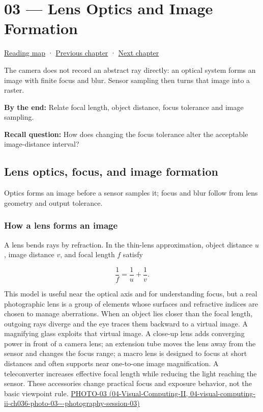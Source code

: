 \hypertarget{03-visual-computing-i-ch003}{}
\chapter{03 --- Lens Optics and Image Formation}\label{03-visual-computing-i-ch003-lens-optics-and-image-formation}

\hyperref[volume-reading-map]{Reading map} · \hyperref[03-visual-computing-i-ch002]{Previous chapter} · \hyperref[03-visual-computing-i-ch004]{Next chapter}

The camera does not record an abstract ray directly: an optical system forms an image with finite focus and blur. Sensor sampling then turns that image into a raster.

\textbf{By the end:} Relate focal length, object distance, focus tolerance and image sampling.

\textbf{Recall question:} How does changing the focus tolerance alter the acceptable image-distance interval?

\section{Lens optics, focus, and image formation}\label{03-visual-computing-i-ch003-lens-optics-focus-and-image-formation}

Optics forms an image before a sensor samples it; focus and blur follow from lens geometry and output tolerance.

\subsection{How a lens forms an image}\label{03-visual-computing-i-ch003-how-a-lens-forms-an-image}

A lens bends rays by refraction. In the thin-lens approximation, object distance \(u\), image distance \(v\), and focal length \(f\) satisfy

\[
\frac{1}{f}=\frac{1}{u}+\frac{1}{v}.
\]

This model is useful near the optical axis and for understanding focus, but a real photographic lens is a group of elements whose surfaces and refractive indices are chosen to manage aberrations. When an object lies closer than the focal length, outgoing rays diverge and the eye traces them backward to a virtual image. A magnifying glass exploits that virtual image. A close-up lens adds converging power in front of a camera lens; an extension tube moves the lens away from the sensor and changes the focus range; a macro lens is designed to focus at short distances and often supports near one-to-one image magnification. A teleconverter increases effective focal length while reducing the light reaching the sensor. These accessories change practical focus and exposure behavior, not the basic viewpoint rule. \href{../04-Visual-Computing-II/main.pdf\#nameddest=04-visual-computing-ii-ch036-photo-03---photography-session-03}{PHOTO-03 (04-Visual-Computing-II, 04-visual-computing-ii-ch036-photo-03-\/-\/-photography-session-03)}

